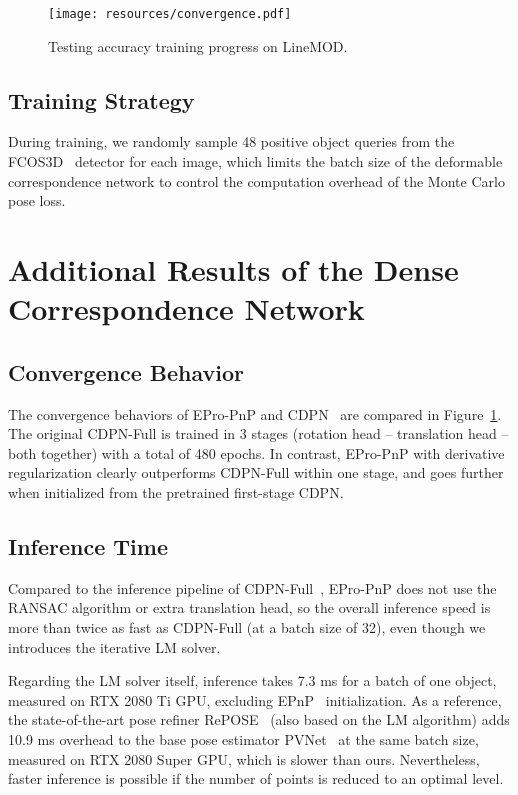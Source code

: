 \documentclass[10pt,twocolumn,letterpaper]{article}
\begin{document}
\begin{figure}[t]
\vspace{-0.5ex}
\begin{center}
    \texttt{[image: resources/convergence.pdf]}
\end{center}
\vspace{-1.2ex}
\caption{Testing accuracy \vs training progress on LineMOD.}
\label{fig:convergence}
\end{figure}

\subsection{Training Strategy}

During training, we randomly sample 48 positive object queries from the FCOS3D~\cite{fcos3d} detector for each image, which limits the batch size of the deformable correspondence network to control the computation overhead of the Monte Carlo pose loss.

\section{Additional Results of the Dense Correspondence Network}

\subsection{Convergence Behavior}

The convergence behaviors of EPro-PnP and CDPN~\cite{CDPN} are compared in Figure~\ref{fig:convergence}. The original CDPN-Full is trained in 3 stages (rotation head -- translation head -- both together) with a total of 480 epochs. In contrast, EPro-PnP with derivative regularization clearly outperforms CDPN-Full within one stage, and goes further when initialized from the pretrained first-stage CDPN.

\subsection{Inference Time}

Compared to the inference pipeline of CDPN-Full~\cite{CDPN}, EPro-PnP does not use the RANSAC algorithm or extra translation head, so the overall inference speed is more than twice as fast as CDPN-Full (at a batch size of 32), even though we introduces the iterative LM solver. 

Regarding the LM solver itself, inference takes 7.3 ms for a batch of one object, measured on RTX 2080 Ti GPU, excluding EPnP~\cite{EPnP} initialization.
As a reference, the state-of-the-art pose refiner RePOSE~\cite{repose} (also based on the LM algorithm) adds 10.9 ms overhead to the base pose estimator PVNet~\cite{pvnet} at the same batch size, measured on RTX 2080 Super GPU,
which is slower than ours.
Nevertheless, faster inference is possible if the number of points  is reduced to an optimal level.
\end{document}

